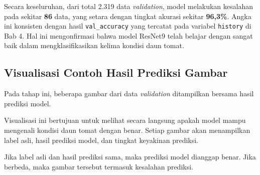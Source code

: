 Secara keseluruhan, dari total 2.319 data \textit{validation}, model melakukan kesalahan pada sekitar \textbf{86} data, yang setara dengan tingkat akurasi sekitar \textbf{96,3\%}. Angka ini konsisten dengan hasil \texttt{val\_accuracy} yang tercatat pada variabel \texttt{history} di Bab 4. Hal ini mengonfirmasi bahwa model ResNet9 telah belajar dengan sangat baik dalam mengklasifikasikan kelima kondisi daun tomat.

\subsection{Visualisasi Contoh Hasil Prediksi Gambar}

Pada tahap ini, beberapa gambar dari data \textit{validation} ditampilkan bersama hasil prediksi model.

Visualisasi ini bertujuan untuk melihat secara langsung apakah model mampu mengenali kondisi daun tomat dengan benar. Setiap gambar akan menampilkan label asli, hasil prediksi model, dan tingkat keyakinan prediksi.

Jika label asli dan hasil prediksi sama, maka prediksi model dianggap benar. Jika berbeda, maka gambar tersebut termasuk kesalahan prediksi.

